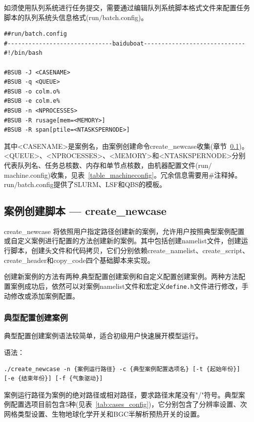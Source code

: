 如须使用队列系统进行任务提交，需要通过编辑队列系统脚本格式文件来配置任务脚本的队列系统头信息格式(run$\slash$batch.config)。

\begin{lstlisting}
##run/batch.config
#------------------------------baiduboat-----------------------------
#!/bin/bash

#BSUB -J <CASENAME>
#BSUB -q <QUEUE>
#BSUB -o colm.o%
#BSUB -e colm.e%
#BSUB -n <NPROCESSES>
#BSUB -R rusage[mem=<MEMORY>]
#BSUB -R span[ptile=<NTASKSPERNODE>]
\end{lstlisting}

其中<CASENAME>是案例名，由案例创建命令create\_newcase收集(章节~\ref{CreateNewcase})。<QUEUE>、<NPROCESSES>、<MEMORY>和<NTASKSPERNODE>分别代表队列名、任务总核数、内存和单节点核数，由机器配置文件(run$\slash$machine.config)收集，见表~\ref{table_machineconfig}。冗余信息需要用\#注释掉。run$\slash$batch.config提供了SLURM、LSF和QBS的模板。

\subsection{案例创建脚本 --- create\_newcase} \label{CreateNewcase}
create\_newcase 将依照用户指定路径创建新的案例，允许用户按照典型案例配置或自定义案例进行配置的方法创建新的案例。其中包括创建namelist文件，创建运行脚本，创建头文件和代码拷贝，它们分别依赖create\_namelist、create\_script、create\_header和copy\_code四个基础脚本来实现。

创建新案例的方法有两种,典型配置创建案例和自定义配置创建案例。两种方法配置案例成功后，依然可以对案例namelist文件和宏定义\texttt{define.h}文件进行修改，手动修改或添加案例配置。

\subsubsection{典型配置创建案例}

典型配置创建案例语法较简单，适合初级用户快速展开模型运行。

语法：

\begin{lstlisting}[xleftmargin=2.5em]
./create_newcase -n {案例运行路径} -c {典型案例配置选项名} [-t {起始年份}] [-e {结束年份}] [-f {气象驱动}]
\end{lstlisting}

案例运行路径为案例的绝对路径或相对路径，要求路径末尾没有"/"符号。典型案例配置选项目前包含5种(见表~\ref{tab:cases_config})，它分别包含了分辨率设置、次网格类型设置、生物地球化学开关和BGC半解析预热开关的设置。


